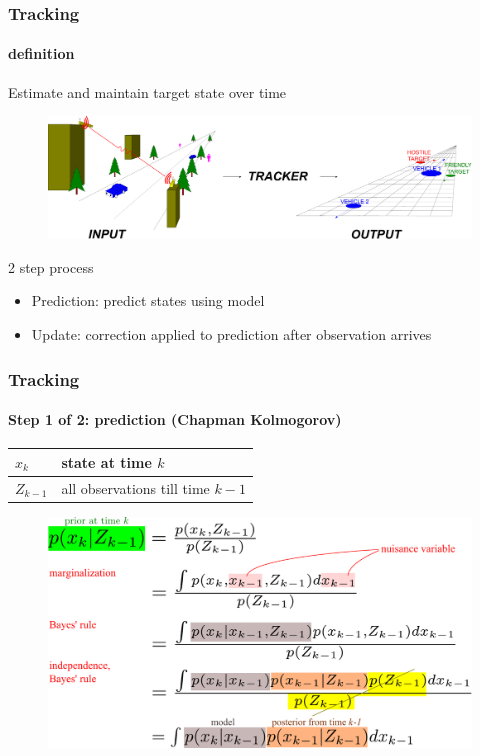 \begin{frame}
\frametitle{Tracking}
\framesubtitle{definition}
\mypagenum{}
Estimate and maintain {\color{red}target state} over {\color{red}time}
\begin{figure}
\includegraphics[width=1.0\textwidth]{thesis/TRK_overviewDiagram.pdf}
\end{figure}
\vspace{0.2in}
2 step process
\begin{itemize}
\item Prediction: predict states using model
\item Update: correction applied to prediction after observation arrives
\end{itemize}
\end{frame}


\begin{frame}
\frametitle{Tracking}
\framesubtitle{Step 1 of 2: prediction (Chapman Kolmogorov)}
\mypagenum{}
\begin{table}
\begin{tabular}{|l|l|}\hline
$x_k$ & state at time $k$\\\hline
$Z_{k-1}$ &  all observations till time $k-1$\\\hline
\end{tabular}
\end{table}
\begin{figure}
\includegraphics[width=1.0\textwidth]{thesis/TRK_EQN_prediction.pdf}
\end{figure}
\end{frame}


